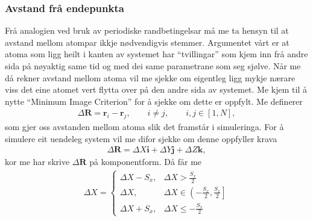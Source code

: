 \documentclass[12pt, a4paper]{article}
\theoremstyle{definition}
\newcommand{\vb}{\mathbf}
\begin{document}
        \subsubsection*{Avstand frå endepunkta}
            Frå analogien ved bruk av periodiske randbetingelsar må me ta hensyn til at avstand mellom atompar ikkje nødvendigvis stemmer. Argumentet vårt er at 
            atoma som ligg heilt i kanten av systemet har ``tvillingar'' som kjem inn frå andre sida på nøyaktig same tid og med dei same parametrane som seg sjølve.
            Når me då rekner avstand mellom atoma vil me sjekke om eigentleg ligg mykje nærare viss det eine atomet vert flytta over på den andre sida av systemet.
            Me kjem til å nytte ``Minimum Image Criterion'' for å sjekke om dette er oppfylt. Me definerer
            \begin{align*}
                \Delta \vb{R} = \vb{r}_i - \vb{r}_j, \qquad i \neq j, \qquad i, j \in [1, N],
            \end{align*}
            som gjer oss avstanden mellom atoma slik det framstår i simuleringa. For å simulere eit uendeleg system vil me difor sjekke om denne oppfyller krava
            \begin{align*}
                \Delta \vb{R} = \Delta X\vb{i} + \Delta Y\vb{j} + \Delta Z\vb{k},
            \end{align*}
            kor me har skrive $\Delta \vb{R}$ på komponentform. Då får me
            \begin{align*}
                \Delta X = 
                \begin{cases}
                    \Delta X - S_x, & \Delta X > \frac{S_x}{2} \\
                    \Delta X, & \Delta X \in \left( -\frac{S_x}{2}, \frac{S_x}{2} \right] \\
                    \Delta X + S_x, & \Delta X \leq -\frac{S_x}{2}
                \end{cases}
            \end{align*}
\end{document}
